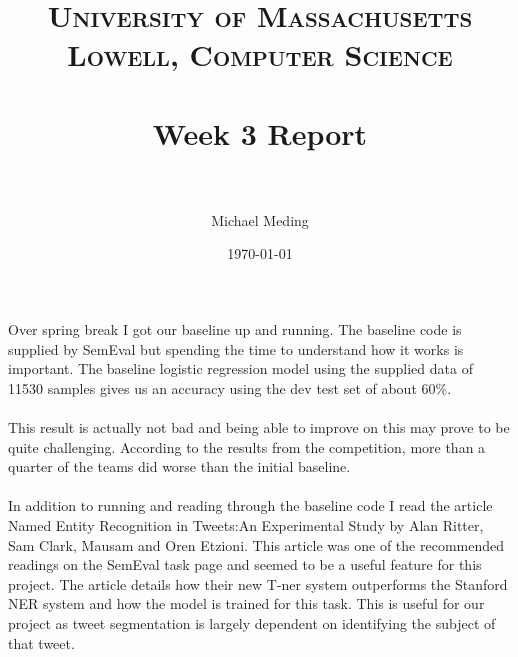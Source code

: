 \documentclass[paper=a4, fontsize=11pt]{scrartcl} %
\title{	
\normalfont \normalsize 
\textsc{University of Massachusetts Lowell, Computer Science} \\ [25pt] %
\horrule{0.5pt} \\[0.4cm] %
\huge Week 3 Report \\ %
\horrule{2pt} \\[0.5cm] %
}
\author{Michael Meding} %
\date{\normalsize\today} %
\numberwithin{equation}{section} %
\numberwithin{figure}{section} %
\numberwithin{table}{section} %
\begin{document}
\maketitle %

\paragraph{}
Over spring break I got our baseline up and running. The baseline code is supplied by SemEval but spending the time to understand how it works is important. The baseline logistic regression model using the supplied data of 11530 samples gives us an accuracy using the dev test set of about 60\%.
\paragraph{}
This result is actually not bad and being able to improve on this may prove to be quite challenging. According to the results from the competition, more than a quarter of the teams did worse than the initial baseline.
\paragraph{}
In addition to running and reading through the baseline code I read the article Named Entity Recognition in Tweets:An Experimental Study by Alan Ritter, Sam Clark, Mausam and Oren Etzioni. This article was one of the recommended readings on the SemEval task page and seemed to be a useful feature for this project. The article details how their new T-ner system outperforms the Stanford NER system and how the model is trained for this task. This is useful for our project as tweet segmentation is largely dependent on identifying the subject of that tweet.
\end{document}
